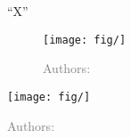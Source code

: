 “X”


    \begin{figure}[h!] %
    \centering
\texttt{[image: fig/]}
\caption{}
    \label{fig:}
    \begin{flushleft}
    \begin{minipage}{1\linewidth}
        \justifying
        \noindent
\tiny{\textcolor{gray}{Authors:}}
        \end{minipage}
    \end{flushleft}
    \end{figure}


    \begin{figure*}[h!] %
    \centering
\texttt{[image: fig/]}
\caption{}
    \label{fig:}
    \begin{flushleft}
    \begin{minipage}{1\linewidth}
        \justifying
        \noindent
\tiny{\textcolor{gray}{Authors:}}
        \end{minipage}
    \end{flushleft}
    \end{figure*}
